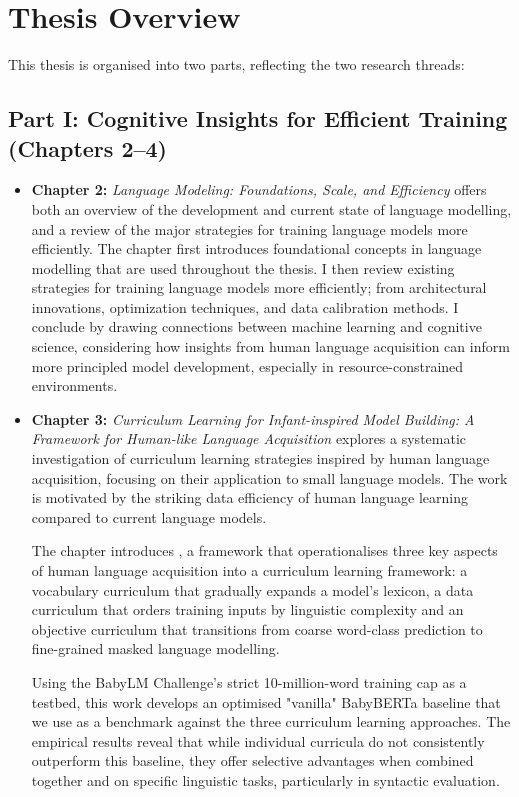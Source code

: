 \section*{Thesis Overview}

This thesis is organised into two parts, reflecting the two research threads:

\subsection*{Part I: Cognitive Insights for Efficient Training (Chapters 2–4)}

\begin{itemize}

    \item \textbf{Chapter 2:} \emph{Language Modeling: Foundations, Scale, and Efficiency} offers both an overview of the development and current state of language modelling, and a review of the major strategies for training language models more efficiently. The chapter first introduces foundational concepts in language modelling that are used throughout the thesis. I then review existing strategies for training language models more efficiently; from architectural innovations, optimization techniques, and data calibration methods. I conclude by drawing connections between machine learning and cognitive science, considering how insights from human language acquisition can inform more principled model development, especially in resource-constrained environments.

    \item \textbf{Chapter 3:} \emph{Curriculum Learning for Infant-inspired Model Building: A Framework for Human-like Language Acquisition}  
    explores a systematic investigation of curriculum learning strategies inspired by human language acquisition, focusing on their application to small language models. The work is motivated by the striking data efficiency of human language learning compared to current language models.

    The chapter introduces \climb, a framework that operationalises three key aspects of human language acquisition into a curriculum learning framework: a vocabulary curriculum that gradually expands a model's lexicon, a data curriculum that orders training inputs by linguistic complexity and an objective curriculum that transitions from coarse word-class prediction to fine-grained masked language modelling.

    Using the BabyLM Challenge's strict 10-million-word training cap as a testbed, this work develops an optimised "vanilla" BabyBERTa baseline that we use as a benchmark against the three curriculum learning approaches. The empirical results reveal that while individual curricula do not consistently outperform this baseline, they offer selective advantages when combined together and on specific linguistic tasks, particularly in syntactic evaluation.


\end{itemize}
